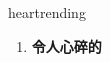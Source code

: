
\begin{frame}
{\huge heartrending}
\begin{center}
\begin{enumerate}\Large
  \item \textbf{令人心碎的}
\end{enumerate}
\end{center}
\end{frame}
